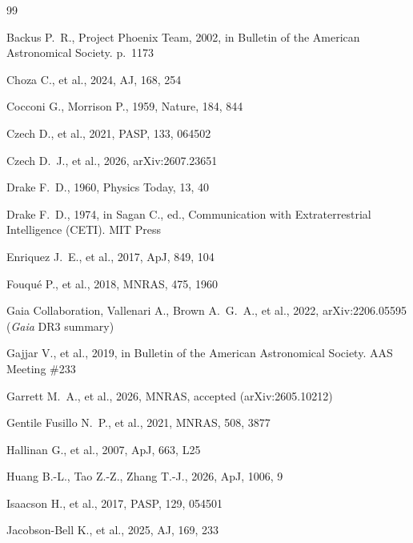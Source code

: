 \documentclass{openjournal}
\begin{document}
\clearpage
\begin{thebibliography}{99}


 Backus P.~R., Project Phoenix Team, 2002, in Bulletin of the American Astronomical Society. p.\ 1173

 Choza C., et al., 2024, AJ, 168, 254

 Cocconi G., Morrison P., 1959, Nature, 184, 844

 Czech D., et al., 2021, PASP, 133, 064502

 Czech D.~J., et al., 2026, arXiv:2607.23651

 Drake F.~D., 1960, Physics Today, 13, 40

 Drake F.~D., 1974, in Sagan C., ed., Communication with Extraterrestrial Intelligence (CETI). MIT Press



 Enriquez J.~E., et al., 2017, ApJ, 849, 104

 Fouqu\'e P., et al., 2018, MNRAS, 475, 1960

 Gaia Collaboration, Vallenari A., Brown A.~G.~A., et al., 2022, arXiv:2206.05595 ({\it Gaia} DR3 summary)

 Gajjar V., et al., 2019, in Bulletin of the American Astronomical Society. AAS Meeting \#233

 Garrett M.~A., et al., 2026, MNRAS, accepted (arXiv:2605.10212)

 Gentile Fusillo N.~P., et al., 2021, MNRAS, 508, 3877



 Hallinan G., et al., 2007, ApJ, 663, L25

 Huang B.-L., Tao Z.-Z., Zhang T.-J., 2026, ApJ, 1006, 9

 Isaacson H., et al., 2017, PASP, 129, 054501

 Jacobson-Bell K., et al., 2025, AJ, 169, 233


\end{thebibliography}
\end{document}
